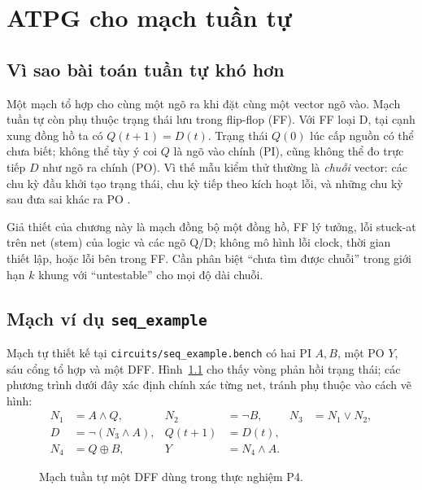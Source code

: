 \chapter{ATPG cho mạch tuần tự}
\label{sec:p4-atpg-tuan-tu}

\section{Vì sao bài toán tuần tự khó hơn}
\label{sec:p4-kho-khan}
Một mạch tổ hợp cho cùng một ngõ ra khi đặt cùng một vector ngõ vào. Mạch tuần
tự còn phụ thuộc trạng thái lưu trong flip-flop (FF). Với FF loại D, tại cạnh
xung đồng hồ ta có $Q(t+1)=D(t)$. Trạng thái $Q(0)$ lúc cấp nguồn có thể chưa
biết; không thể tùy ý coi $Q$ là ngõ vào chính (PI), cũng không thể đo trực
tiếp $D$ như ngõ ra chính (PO). Vì thế mẫu kiểm thử thường là \emph{chuỗi}
vector: các chu kỳ đầu khởi tạo trạng thái, chu kỳ tiếp theo kích hoạt lỗi, và
những chu kỳ sau đưa sai khác ra PO \cite{p4_nptel_seq}.

Giả thiết của chương này là mạch đồng bộ một đồng hồ, FF lý tưởng, lỗi
stuck-at trên net (stem) của logic và các ngõ Q/D; không mô hình lỗi clock,
thời gian thiết lập, hoặc lỗi bên trong FF. Cần phân biệt ``chưa tìm được
chuỗi'' trong giới hạn $k$ khung với ``untestable'' cho mọi độ dài chuỗi.

\section{Mạch ví dụ \texttt{seq\_example}}
\label{sec:p4-mach-vi-du}
Mạch tự thiết kế tại \texttt{circuits/seq\_example.bench} có hai PI $A,B$,
một PO $Y$, sáu cổng tổ hợp và một DFF. Hình~\ref{fig:p4-seq-circuit}
cho thấy vòng phản hồi trạng thái; các phương trình dưới đây xác định chính
xác từng net, tránh phụ thuộc vào cách vẽ hình:
\begin{align}
N_1&=A\land Q, &N_2&=\neg B, &N_3&=N_1\lor N_2,\\
D&=\neg(N_3\land A), &Q(t+1)&=D(t),\\
N_4&=Q\oplus B, &Y&=N_4\land A.
\end{align}
\begin{figure}[H]
\centering
\caption{Mạch tuần tự một DFF dùng trong thực nghiệm P4.}
\label{fig:p4-seq-circuit}
\end{figure}

